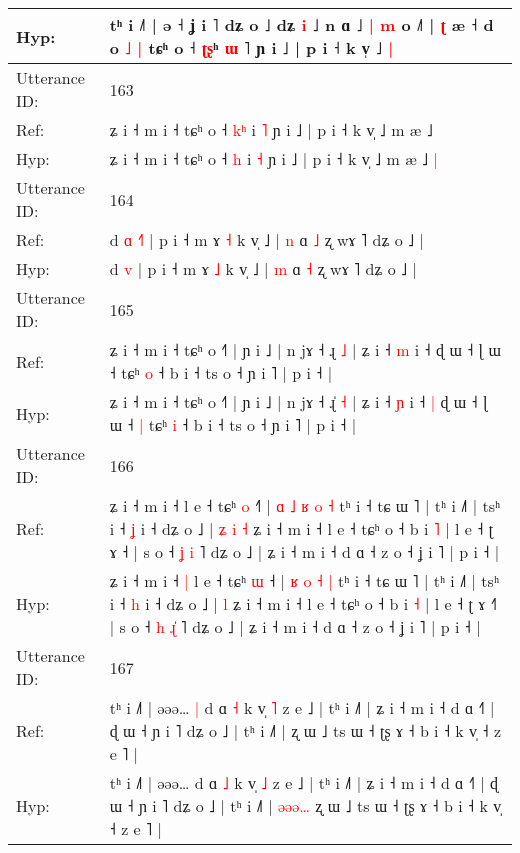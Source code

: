 \documentclass[10pt]{article}
\DeclareRobustCommand{\hl}[1]{{\textcolor{red}{#1}}}
\begin{document}
\begin{longtable}{ll}
Hyp: & tʰ i ˩˥ | ə ˧ ʝ i ˥ dʑ o ˩\hl{}\hl{} dʑ \hl{i} ˩ n ɑ ˩\hl{}\hl{}\hl{}\hl{} \hl{|} \hl{m} o ˩˥ | \hl{ʈ} æ ˧ d o\hl{ }\hl{˩} \hl{|} tɕʰ o ˧ \hl{ʈ}\hl{ʂ}ʰ \hl{ɯ} ˥ ɲ i ˩ | p i ˧ k v̩ ˩\hl{ }\hl{|}
 \\
\midrule
Utterance ID: & 163 \\
Ref: & ʑ i ˧ m i ˧ tɕʰ o ˧ \hl{k}\hl{ʰ} i \hl{˥} ɲ i ˩ | p i ˧ k v̩ ˩ m æ ˩\hl{}\hl{}
 \\
Hyp: & ʑ i ˧ m i ˧ tɕʰ o ˧ \hl{}\hl{h} i \hl{˧} ɲ i ˩ | p i ˧ k v̩ ˩ m æ ˩\hl{ }\hl{|}
 \\
\midrule
Utterance ID: & 164 \\
Ref: & d\hl{ }\hl{ɑ} \hl{˧}\hl{˥} | p i ˧ m ɤ \hl{˧} k v̩ ˩ | \hl{n} ɑ \hl{˩} ʐ wɤ ˥ dʑ o ˩ |
 \\
Hyp: & d\hl{}\hl{} \hl{}\hl{v} | p i ˧ m ɤ \hl{˩} k v̩ ˩ | \hl{m} ɑ \hl{˧} ʐ wɤ ˥ dʑ o ˩ |
 \\
\midrule
Utterance ID: & 165 \\
Ref: & ʑ i ˧ m i ˧ tɕʰ o ˧˥ | ɲ i ˩ | n jɤ ˧ ɻ\hl{} \hl{˩} | ʑ i ˧ \hl{m} i ˧\hl{}\hl{} ɖ ɯ ˧ ɭ ɯ ˧\hl{}\hl{} tɕʰ \hl{o} ˧ b i ˧ ts o ˧ ɲ i ˥ | p i ˧ |
 \\
Hyp: & ʑ i ˧ m i ˧ tɕʰ o ˧˥ | ɲ i ˩ | n jɤ ˧ ɻ\hl{̍} \hl{˧} | ʑ i ˧ \hl{ɲ} i ˧\hl{ }\hl{|} ɖ ɯ ˧ ɭ ɯ ˧\hl{ }\hl{|} tɕʰ \hl{i} ˧ b i ˧ ts o ˧ ɲ i ˥ | p i ˧ |
 \\
\midrule
Utterance ID: & 166 \\
Ref: & ʑ i ˧ m i ˧\hl{}\hl{} l e ˧ tɕʰ \hl{o} ˧\hl{˥} |\hl{ }\hl{ɑ} \hl{˩} \hl{ʁ} \hl{o} \hl{˧} tʰ i ˧ tɕ ɯ ˥ | tʰ i ˩˥ | tsʰ i ˧ \hl{ʝ} i ˧ dʑ o ˩ |\hl{ }\hl{ʑ}\hl{ }\hl{i} \hl{˧} ʑ i ˧ m i ˧ l e ˧ tɕʰ o ˧ b i \hl{˥} | l e ˧ ʈ ɤ ˧\hl{} | s o ˧ \hl{ʝ} \hl{}\hl{i} ˥ dʑ o ˩ | ʑ i ˧ m i ˧ d ɑ ˧ z o ˧ ʝ i ˥ | p i ˧ |
 \\
Hyp: & ʑ i ˧ m i ˧\hl{ }\hl{|} l e ˧ tɕʰ \hl{ɯ} ˧\hl{} |\hl{}\hl{} \hl{ʁ} \hl{o} \hl{˧} \hl{|} tʰ i ˧ tɕ ɯ ˥ | tʰ i ˩˥ | tsʰ i ˧ \hl{h} i ˧ dʑ o ˩ |\hl{}\hl{}\hl{}\hl{} \hl{l} ʑ i ˧ m i ˧ l e ˧ tɕʰ o ˧ b i \hl{˧} | l e ˧ ʈ ɤ ˧\hl{˥} | s o ˧ \hl{h} \hl{ɻ}\hl{̍} ˥ dʑ o ˩ | ʑ i ˧ m i ˧ d ɑ ˧ z o ˧ ʝ i ˥ | p i ˧ |
 \\
\midrule
Utterance ID: & 167 \\
Ref: & tʰ i ˩˥ | əəə…\hl{ }\hl{|} d ɑ \hl{˧} k v̩ \hl{˥} z e ˩ | tʰ i ˩˥ | ʑ i ˧ m i ˧ d ɑ ˧˥ | ɖ ɯ ˧ ɲ i ˥ dʑ o ˩ | tʰ i ˩˥ |\hl{}\hl{}\hl{}\hl{}\hl{} ʐ ɯ ˩ ts ɯ ˧ ʈʂ ɤ ˧ b i ˧ k v̩ ˧ z e ˥ |
 \\
Hyp: & tʰ i ˩˥ | əəə…\hl{}\hl{} d ɑ \hl{˩} k v̩ \hl{˩} z e ˩ | tʰ i ˩˥ | ʑ i ˧ m i ˧ d ɑ ˧˥ | ɖ ɯ ˧ ɲ i ˥ dʑ o ˩ | tʰ i ˩˥ |\hl{ }\hl{ə}\hl{ə}\hl{ə}\hl{…} ʐ ɯ ˩ ts ɯ ˧ ʈʂ ɤ ˧ b i ˧ k v̩ ˧ z e ˥ |

\end{longtable}
\end{document}
